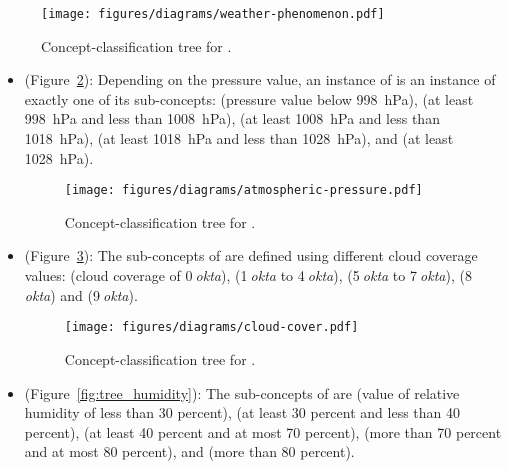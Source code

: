 \begin{figure}
  \centering
  \texttt{[image: figures/diagrams/weather-phenomenon.pdf]}
  \caption[Concept-classification tree for ]{Concept-classification tree for .}
  \label{fig:tree_weather_phenomenon}
\end{figure}

\begin{itemize}
  \item {} (Figure~\ref{fig:tree_atmospheric_pressure}): Depending on the pressure value, an instance of  is an instance of exactly one of its sub-concepts:  (pressure value below \SI{998}{\hecto\pascal}),  (at least \SI{998}{\hecto\pascal} and less than \SI{1008}{\hecto\pascal}),  (at least \SI{1008}{\hecto\pascal} and less than \SI{1018}{\hecto\pascal}),  (at least \SI{1018}{\hecto\pascal} and less than \SI{1028}{\hecto\pascal}), and  (at least \SI{1028}{\hecto\pascal}).
  
  \begin{figure}
    \centering
    \texttt{[image: figures/diagrams/atmospheric-pressure.pdf]}
    \caption[Concept-classification tree for ]{Concept-classification tree for .}
    \label{fig:tree_atmospheric_pressure}
  \end{figure}

  \item {} (Figure~\ref{fig:tree_cloud_cover}): The sub-concepts of  are defined using different cloud coverage values:  (cloud coverage of \num{0}$\:$\emph{okta}),  (\num{1}$\:$\emph{okta} to \num{4}$\:$\emph{okta}),  (\num{5}$\:$\emph{okta} to \num{7}$\:$\emph{okta}),  (\num{8}$\:$\emph{okta}) and  (\num{9}$\:$\emph{okta}).
  
  \begin{figure}
    \centering
    \texttt{[image: figures/diagrams/cloud-cover.pdf]}
    \caption[Concept-classification tree for ]{Concept-classification tree for .}
    \label{fig:tree_cloud_cover}
  \end{figure}

  \item {} (Figure~\ref{fig:tree_humidity}): The sub-concepts of  are  (value of relative humidity of less than \num{30} percent),  (at least \num{30} percent and less than \num{40} percent),  (at least \num{40} percent and at most \num{70} percent),  (more than \num{70} percent and at most \num{80} percent), and  (more than \num{80} percent).
  

\end{itemize}

